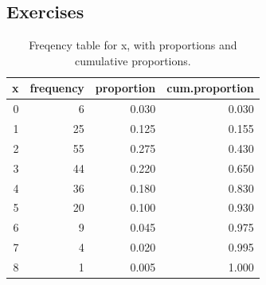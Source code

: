 \documentclass[]{report}\usepackage[]{graphicx}\usepackage[]{color}
\begin{document}
\subsection{Exercises}

\begin{table}[ht]
\centering
\caption{Freqency table for x, with proportions and cumulative proportions.} 
\label{tab:frequency_2}
\begin{tabular}{rrrr}
  \hline
x & frequency & proportion & cum.proportion \\ 
  \hline
   0 &    6 & 0.030 & 0.030 \\ 
     1 &   25 & 0.125 & 0.155 \\ 
     2 &   55 & 0.275 & 0.430 \\ 
     3 &   44 & 0.220 & 0.650 \\ 
     4 &   36 & 0.180 & 0.830 \\ 
     5 &   20 & 0.100 & 0.930 \\ 
     6 &    9 & 0.045 & 0.975 \\ 
     7 &    4 & 0.020 & 0.995 \\ 
     8 &    1 & 0.005 & 1.000 \\ 
   \hline
\end{tabular}
\end{table}
\end{document}
